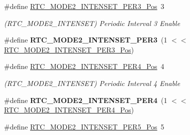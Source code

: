 \begin{DoxyCompactItemize}
\item 
\hypertarget{group___s_a_m_l21___r_t_c_ga064a04e461f994c5169adfffe39637b9}{}\#define \hyperlink{group___s_a_m_l21___r_t_c_ga064a04e461f994c5169adfffe39637b9}{R\+T\+C\+\_\+\+M\+O\+D\+E2\+\_\+\+I\+N\+T\+E\+N\+S\+E\+T\+\_\+\+P\+E\+R3\+\_\+\+Pos}~3\label{group___s_a_m_l21___r_t_c_ga064a04e461f994c5169adfffe39637b9}

\begin{DoxyCompactList}\small\item\em (R\+T\+C\+\_\+\+M\+O\+D\+E2\+\_\+\+I\+N\+T\+E\+N\+S\+E\+T) Periodic Interval 3 Enable \end{DoxyCompactList}\item 
\hypertarget{group___s_a_m_l21___r_t_c_ga5b9568e99a61a71eaf30daf4df999720}{}\#define {\bfseries R\+T\+C\+\_\+\+M\+O\+D\+E2\+\_\+\+I\+N\+T\+E\+N\+S\+E\+T\+\_\+\+P\+E\+R3}~(1 $<$$<$ \hyperlink{group___s_a_m_l21___r_t_c_ga064a04e461f994c5169adfffe39637b9}{R\+T\+C\+\_\+\+M\+O\+D\+E2\+\_\+\+I\+N\+T\+E\+N\+S\+E\+T\+\_\+\+P\+E\+R3\+\_\+\+Pos})\label{group___s_a_m_l21___r_t_c_ga5b9568e99a61a71eaf30daf4df999720}

\item 
\hypertarget{group___s_a_m_l21___r_t_c_gacfd021d9ab28f496e1e324c0db669fe4}{}\#define \hyperlink{group___s_a_m_l21___r_t_c_gacfd021d9ab28f496e1e324c0db669fe4}{R\+T\+C\+\_\+\+M\+O\+D\+E2\+\_\+\+I\+N\+T\+E\+N\+S\+E\+T\+\_\+\+P\+E\+R4\+\_\+\+Pos}~4\label{group___s_a_m_l21___r_t_c_gacfd021d9ab28f496e1e324c0db669fe4}

\begin{DoxyCompactList}\small\item\em (R\+T\+C\+\_\+\+M\+O\+D\+E2\+\_\+\+I\+N\+T\+E\+N\+S\+E\+T) Periodic Interval 4 Enable \end{DoxyCompactList}\item 
\hypertarget{group___s_a_m_l21___r_t_c_gade40fc4e744f6661050f9afcf65248af}{}\#define {\bfseries R\+T\+C\+\_\+\+M\+O\+D\+E2\+\_\+\+I\+N\+T\+E\+N\+S\+E\+T\+\_\+\+P\+E\+R4}~(1 $<$$<$ \hyperlink{group___s_a_m_l21___r_t_c_gacfd021d9ab28f496e1e324c0db669fe4}{R\+T\+C\+\_\+\+M\+O\+D\+E2\+\_\+\+I\+N\+T\+E\+N\+S\+E\+T\+\_\+\+P\+E\+R4\+\_\+\+Pos})\label{group___s_a_m_l21___r_t_c_gade40fc4e744f6661050f9afcf65248af}

\item 
\hypertarget{group___s_a_m_l21___r_t_c_ga19d32e2c705aafd9e35ea9d77637e68f}{}\#define \hyperlink{group___s_a_m_l21___r_t_c_ga19d32e2c705aafd9e35ea9d77637e68f}{R\+T\+C\+\_\+\+M\+O\+D\+E2\+\_\+\+I\+N\+T\+E\+N\+S\+E\+T\+\_\+\+P\+E\+R5\+\_\+\+Pos}~5\label{group___s_a_m_l21___r_t_c_ga19d32e2c705aafd9e35ea9d77637e68f}


\end{DoxyCompactItemize}
